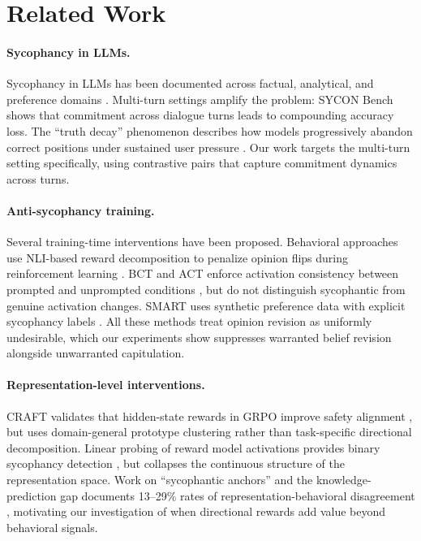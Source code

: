 \documentclass[11pt,a4paper]{article}
\begin{document}
\section{Related Work}

\paragraph{Sycophancy in LLMs.}
Sycophancy in LLMs has been documented across factual, analytical, and preference domains \cite{sycnotone,sharma2024sycophancy}. Multi-turn settings amplify the problem: SYCON Bench \cite{syconbench} shows that commitment across dialogue turns leads to compounding accuracy loss. The ``truth decay'' phenomenon describes how models progressively abandon correct positions under sustained user pressure \cite{truthdecay}. Our work targets the multi-turn setting specifically, using contrastive pairs that capture commitment dynamics across turns.

\paragraph{Anti-sycophancy training.}
Several training-time interventions have been proposed. Behavioral approaches use NLI-based reward decomposition to penalize opinion flips during reinforcement learning \cite{pressurewhatpressure}. BCT and ACT enforce activation consistency between prompted and unprompted conditions \cite{act}, but do not distinguish sycophantic from genuine activation changes. SMART uses synthetic preference data with explicit sycophancy labels \cite{smart}. All these methods treat opinion revision as uniformly undesirable, which our experiments show suppresses warranted belief revision alongside unwarranted capitulation.

\paragraph{Representation-level interventions.}
CRAFT validates that hidden-state rewards in GRPO improve safety alignment \cite{craft}, but uses domain-general prototype clustering rather than task-specific directional decomposition. Linear probing of reward model activations provides binary sycophancy detection \cite{linearprobes}, but collapses the continuous structure of the representation space. Work on ``sycophantic anchors'' and the knowledge-prediction gap documents 13--29\% rates of representation-behavioral disagreement \cite{knowledgegap,sycanchors}, motivating our investigation of when directional rewards add value beyond behavioral signals.
\end{document}
